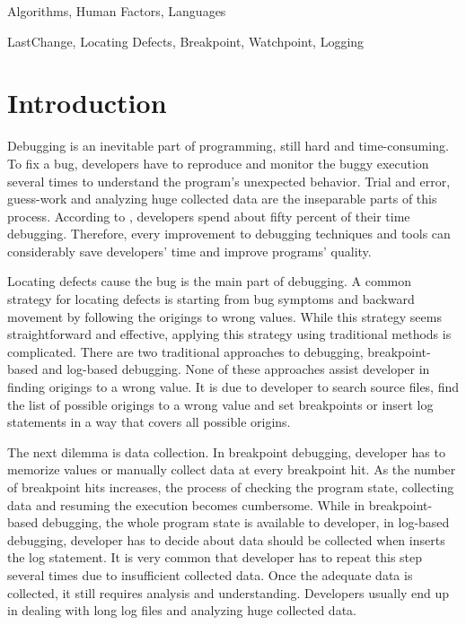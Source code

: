 \documentclass[preprint]{sigplanconf}
\begin{document}

\terms
Algorithms, Human Factors, Languages

\keywords
LastChange, Locating Defects, Breakpoint, Watchpoint, Logging

\section{Introduction}
Debugging is an inevitable part of programming, still hard and time-consuming. To fix a bug, developers have to reproduce and monitor the buggy execution several times to understand the program's unexpected behavior. Trial and error, guess-work and analyzing huge collected data are the inseparable parts of this process. According to \cite{LaToza}, developers spend about fifty percent of their time debugging. Therefore, every improvement to debugging techniques and tools can considerably save developers' time and improve programs' quality.

Locating defects cause the bug is the main part of debugging. A common strategy for locating defects is starting from bug symptoms and backward movement by following the origings to wrong values. While this strategy seems straightforward and effective, applying this strategy using traditional methods is complicated. There are two traditional approaches to debugging, breakpoint-based and log-based debugging. None of these approaches assist developer in finding origings to a wrong value. It is due to developer to search source files, find the list of possible origings to a wrong value and set breakpoints or insert log statements in a way that covers all possible origins.

The next dilemma is data collection. In breakpoint debugging, developer has to memorize values or manually collect data at every breakpoint hit. As the number of breakpoint hits increases, the process of checking the program state, collecting data and resuming the execution becomes cumbersome. While in breakpoint-based debugging, the whole program state is available to developer, in log-based debugging, developer has to decide about data should be collected when inserts the log statement. It is very common that developer has to repeat this step several times due to insufficient collected data. Once the adequate data is collected, it still requires analysis and understanding. Developers usually end up in dealing with long log files and analyzing huge collected data.
\end{document}
